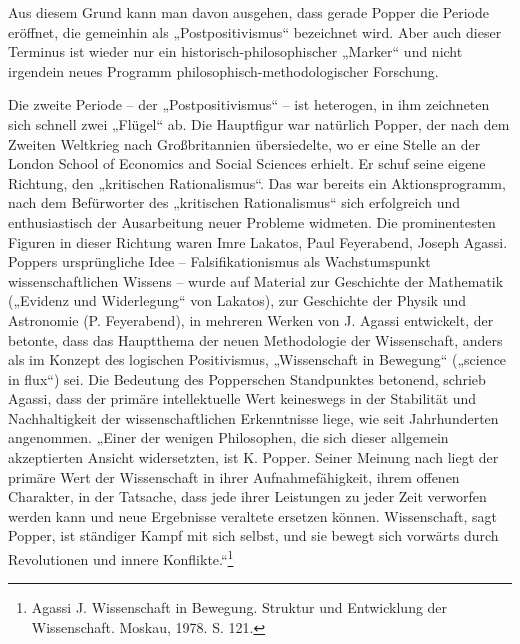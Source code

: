 \documentclass[11pt,a4paper]{article}
\begin{document}
Aus diesem Grund kann man davon ausgehen, dass gerade Popper die Periode
eröffnet, die gemeinhin als „Postpositivismus“ bezeichnet wird. Aber auch
dieser Terminus ist wieder nur ein historisch-philosophischer „Marker“ und
nicht irgendein neues Programm philosophisch-methodologischer Forschung.

Die zweite Periode -- der „Postpositivismus“ -- ist heterogen, in ihm
zeichneten sich schnell zwei „Flügel“ ab. Die Hauptfigur war natürlich Popper,
der nach dem Zweiten Weltkrieg nach Großbritannien übersiedelte, wo er eine
Stelle an der London School of Economics and Social Sciences erhielt. Er schuf
seine eigene Richtung, den „kritischen Rationalismus“. Das war bereits ein
Aktionsprogramm, nach dem Befürworter des „kritischen Rationalismus“ sich
erfolgreich und enthusiastisch der Ausarbeitung neuer Probleme widmeten. Die
prominentesten Figuren in dieser Richtung waren Imre Lakatos, Paul Feyerabend,
Joseph Agassi.  Poppers ursprüngliche Idee -- Falsifikationismus als
Wachstumspunkt wissenschaftlichen Wissens -- wurde auf Material zur Geschichte
der Mathematik („Evidenz und Widerlegung“ von Lakatos), zur Geschichte der
Physik und Astronomie (P. Feyerabend), in mehreren Werken von J. Agassi
entwickelt, der betonte, dass das Hauptthema der neuen Methodologie der
Wissenschaft, anders als im Konzept des logischen Positivismus, „Wissenschaft
in Bewegung“ („science in flux“) sei. Die Bedeutung des Popperschen
Standpunktes betonend, schrieb Agassi, dass der primäre intellektuelle Wert
keineswegs in der Stabilität und Nachhaltigkeit der wissenschaftlichen
Erkenntnisse liege, wie seit Jahrhunderten angenommen. „Einer der wenigen
Philosophen, die sich dieser allgemein akzeptierten Ansicht widersetzten, ist
K. Popper. Seiner Meinung nach liegt der primäre Wert der Wissenschaft in
ihrer Aufnahmefähigkeit, ihrem offenen Charakter, in der Tatsache, dass jede
ihrer Leistungen zu jeder Zeit verworfen werden kann und neue Ergebnisse
veraltete ersetzen können. Wissenschaft, sagt Popper, ist ständiger Kampf mit
sich selbst, und sie bewegt sich vorwärts durch Revolutionen und innere
Konflikte.“\footnote{Agassi J. Wissenschaft in Bewegung. Struktur und
  Entwicklung der Wissenschaft. Moskau, 1978. S. 121.}
\end{document}
